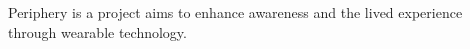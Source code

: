 
Periphery is a project aims to enhance awareness and the lived experience through wearable technology.